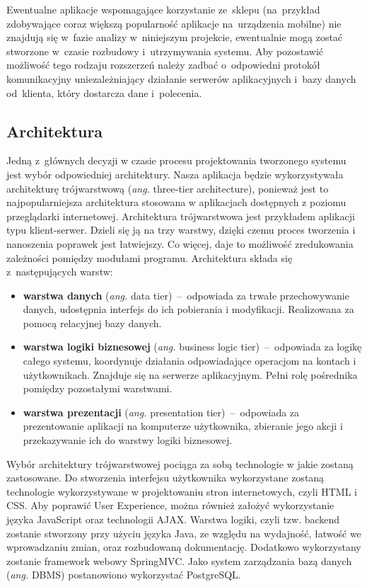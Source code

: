 Ewentualne aplikacje wspomagające korzystanie ze~sklepu (na~przykład zdobywające coraz większą popularność aplikacje na~urządzenia mobilne) nie znajdują się w~fazie analizy w~niniejszym projekcie, ewentualnie mogą zostać stworzone w~czasie rozbudowy i~utrzymywania systemu. Aby pozostawić możliwość tego rodzaju rozszerzeń należy zadbać o~odpowiedni protokół komunikacyjny uniezależniający działanie serwerów aplikacyjnych i~bazy danych od~klienta, który dostarcza dane i~polecenia.

\subsection{Architektura}

Jedną z~głównych decyzji w czasie procesu projektowania tworzonego systemu jest wybór odpowiedniej architektury. Nasza
aplikacja będzie wykorzystywała architekturę trójwarstwową (\textit{ang.} three-tier architecture), ponieważ jest to
najpopularniejsza architektura stosowana w aplikacjach dostępnych z poziomu przeglądarki internetowej. Architektura
trójwarstwowa jest przykładem aplikacji typu klient-serwer. Dzieli się ją na trzy warstwy, dzięki czemu proces tworzenia
i nanoszenia poprawek jest łatwiejszy. Co więcej, daje to możliwość zredukowania zależności pomiędzy modułami programu.
Architektura składa się z~następujących warstw: 
\begin{itemize}
  \item \textbf{warstwa danych} (\textit{ang.} data tier)~--~odpowiada za trwałe przechowywanie danych, udostępnia
    interfejs do ich pobierania i modyfikacji. Realizowana za pomocą relacyjnej bazy danych.
  \item \textbf{warstwa logiki biznesowej} (\textit{ang.} business logic tier)~--~odpowiada za logikę całego systemu,
  koordynuje działania odpowiadające operacjom na kontach i użytkownikach. Znajduje się na serwerze aplikacyjnym. Pełni
  rolę pośrednika pomiędzy pozostałymi warstwami.
  \item \textbf{warstwa prezentacji} (\textit{ang.} presentation tier)~--~odpowiada za prezentowanie aplikacji na
  komputerze użytkownika, zbieranie jego akcji i przekazywanie ich do warstwy logiki biznesowej.
\end{itemize}

Wybór architektury trójwarstwowej pociąga za sobą technologie w jakie zostaną zastosowane. Do stworzenia interfejsu
użytkownika wykorzystane zostaną technologie wykorzystywane w projektowaniu stron internetowych, czyli HTML i CSS. Aby
poprawić User Experience, można również założyć wykorzystanie języka JavaScript oraz technologii AJAX. Warstwa logiki,
czyli tzw. backend zostanie stworzony przy użyciu języka Java, ze względu na wydajność, łatwość we wprowadzaniu
zmian, oraz rozbudowaną dokumentację. Dodatkowo wykorzystany zostanie framework webowy SpringMVC. Jako system
zarządzania bazą danych (\textit{ang.} DBMS) postanowiono wykorzystać PostgreSQL.

